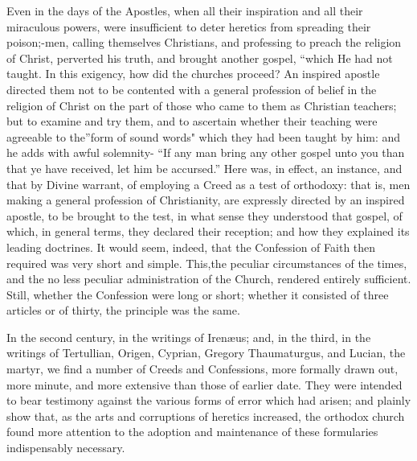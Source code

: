 \documentclass[
]{book}
\begin{document}
Even in the days of the Apostles, when all their inspiration and all their miraculous powers, were insufficient to deter heretics from spreading their poison;-men, calling themselves Christians, and professing to preach the religion of Christ, perverted his truth, and brought another gospel, ``which He had not taught. In this exigency, how did the churches proceed? An inspired apostle directed them not to be contented with a general profession of belief in the religion of Christ on the part of those who came to them as Christian teachers; but to examine and try them, and to ascertain whether their teaching were agreeable to the''form of sound words" which they had been taught by him: and he adds with awful solemnity- ``If any man bring any other gospel unto you than that ye have received, let him be accursed.'' Here was, in effect, an instance, and that by Divine warrant, of employing a Creed as a test of orthodoxy: that is, men making a general profession of Christianity, are expressly directed by an inspired apostle, to be brought to the test, in what sense they understood that gospel, of which, in general terms, they declared their reception; and how they explained its leading doctrines. It would seem, indeed, that the Confession of Faith then required was very short and simple. This,the peculiar circumstances of the times, and the no less peculiar administration of the Church, rendered entirely sufficient. Still, whether the Confession were long or short; whether it consisted of three articles or of thirty, the principle was the same.

In the second century, in the writings of Irenæus; and, in the third, in the writings of Tertullian, Origen, Cyprian, Gregory Thaumaturgus, and Lucian, the martyr, we find a number of Creeds and Confessions, more formally drawn out, more minute, and more extensive than those of earlier date. They were intended to bear testimony against the various forms of error which had arisen; and plainly show that, as the arts and corruptions of heretics increased, the orthodox church found more attention to the adoption and maintenance of these formularies indispensably necessary.
\end{document}
